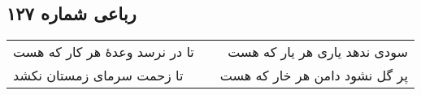\begin{center}
\section*{رباعی شماره ۱۲۷}
\label{sec:sh127}
\begin{longtable}{l p{0.5cm} r}
تا در نرسد وعدهٔ هر کار که هست
&&
سودی ندهد یاری هر یار که هست
\\
تا زحمت سرمای زمستان نکشد
&&
پر گل نشود دامن هر خار که هست
\\
\end{longtable}
\end{center}

